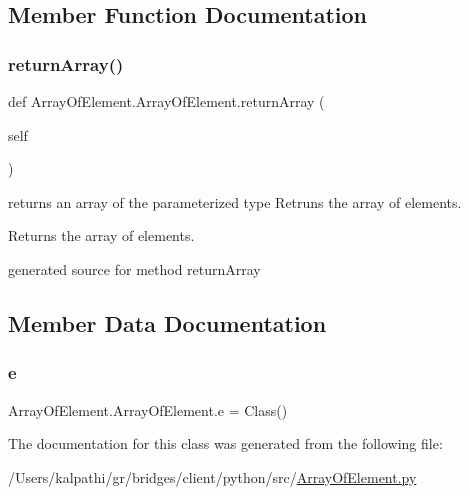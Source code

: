 \subsection{Member Function Documentation}
\hypertarget{class_array_of_element_1_1_array_of_element_a739aa09f3989612b3508ce85995aee7b}{}\label{class_array_of_element_1_1_array_of_element_a739aa09f3989612b3508ce85995aee7b} 
\subsubsection{\texorpdfstring{return\+Array()}{returnArray()}}
{\footnotesize\ttfamily def Array\+Of\+Element.\+Array\+Of\+Element.\+return\+Array (\begin{DoxyParamCaption}\item[{}]{self }\end{DoxyParamCaption})}



returns an array of the parameterized type Retruns the array of elements. 

\begin{DoxyReturn}{Returns}
the array of elements. \begin{DoxyVerb}generated source for method returnArray \end{DoxyVerb}
 
\end{DoxyReturn}


\subsection{Member Data Documentation}
\hypertarget{class_array_of_element_1_1_array_of_element_aabd7ed80731e426b27ef1997422a56f5}{}\label{class_array_of_element_1_1_array_of_element_aabd7ed80731e426b27ef1997422a56f5} 
\subsubsection{\texorpdfstring{e}{e}}
{\footnotesize\ttfamily Array\+Of\+Element.\+Array\+Of\+Element.\+e = Class()\hspace{0.3cm}{\ttfamily [static]}}



The documentation for this class was generated from the following file\+:\begin{DoxyCompactItemize}
\item 
/\+Users/kalpathi/gr/bridges/client/python/src/\hyperlink{_array_of_element_8py}{Array\+Of\+Element.\+py}\end{DoxyCompactItemize}

